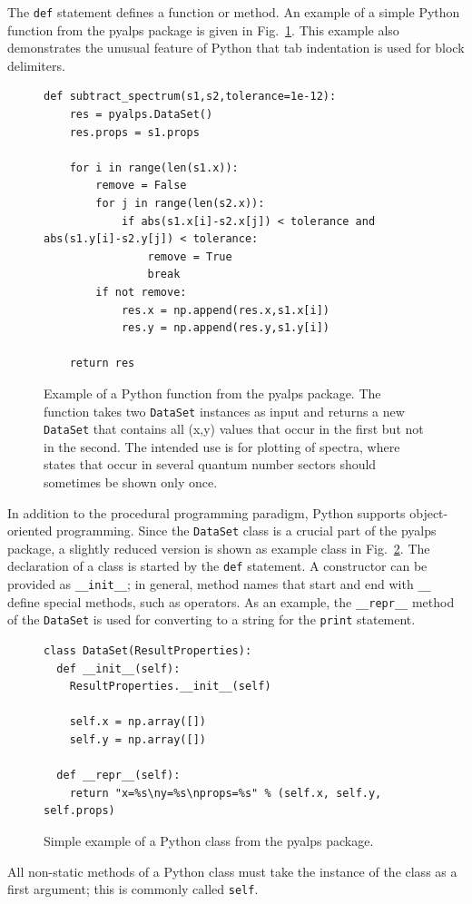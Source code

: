 \documentclass[12pt]{iopart}
\begin{document}
The {\tt def} statement defines a function or method. An example of a simple Python function from the pyalps package is given in Fig.~\ref{fig:Pythonfunction}. This example also demonstrates the unusual feature of Python that tab indentation is used for block delimiters.

\begin{figure}
\begin{lstlisting}
def subtract_spectrum(s1,s2,tolerance=1e-12):
    res = pyalps.DataSet()
    res.props = s1.props

    for i in range(len(s1.x)):
        remove = False
        for j in range(len(s2.x)):
            if abs(s1.x[i]-s2.x[j]) < tolerance and abs(s1.y[i]-s2.y[j]) < tolerance:
                remove = True
                break
        if not remove:
            res.x = np.append(res.x,s1.x[i])
            res.y = np.append(res.y,s1.y[i])
    
    return res
\end{lstlisting}
\caption{Example of a Python function from the pyalps package. The function takes two {\tt DataSet} instances as input and returns a new {\tt DataSet} that contains all (x,y) values that occur in the first but not in the second. The intended use is for plotting of spectra, where states that occur in several quantum number sectors should sometimes be shown only once.}
\label{fig:Pythonfunction}
\end{figure}

In addition to the procedural programming paradigm, Python supports object-oriented programming. Since the {\tt DataSet} class is a crucial part of the pyalps package, a slightly reduced version is shown as example class in Fig.~\ref{fig:Pythonclass}. The declaration of a class is started by the {\tt def} statement. A constructor can be provided as {\tt \_\_init\_\_}; in general, method names that start and end with {\tt \_\_} define special methods, such as operators. As an example, the {\tt \_\_repr\_\_} method of the {\tt DataSet} is used for converting to a string for the {\tt print} statement.

\begin{figure}
\begin{lstlisting}
class DataSet(ResultProperties):
  def __init__(self):
    ResultProperties.__init__(self)
    
    self.x = np.array([])
    self.y = np.array([])
    
  def __repr__(self):
    return "x=%s\ny=%s\nprops=%s" % (self.x, self.y, self.props)
\end{lstlisting}
\caption{Simple example of a Python class from the pyalps package.}
\label{fig:Pythonclass}
\end{figure}
All non-static methods of a Python class must take the instance of the class as a first argument; this is commonly called {\tt self}.
\end{document}
